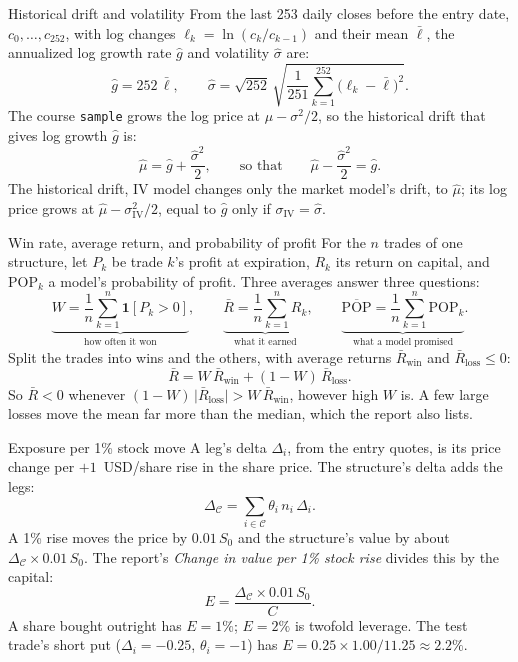\documentclass[aspectratio=169,11pt]{beamer}
\newcommand{\one}{\mathbf{1}}
\newcommand{\POP}{\mathrm{POP}}
\newcommand{\IV}{\sigma_{\mathrm{IV}}}
\begin{document}
\begin{frame}{Historical drift and volatility}\label{fr:hist}
From the last 253 daily closes before the entry date, $c_0,\ldots,c_{252}$, with
log changes $\ell_k=\ln(c_k/c_{k-1})$ and their mean $\bar\ell$, the annualized
log growth rate $\hat g$ and volatility $\hat\sigma$ are:
\[
 \hat g=252\,\bar\ell,\qquad
 \hat\sigma=\sqrt{252}\,\sqrt{\frac{1}{251}\sum_{k=1}^{252}\bigl(\ell_k-\bar\ell\bigr)^2}.
\]
The course \texttt{sample} grows the log price at $\mu-\sigma^2/2$, so the
historical drift that gives log growth $\hat g$ is:
\[
 \hat\mu=\hat g+\frac{\hat\sigma^2}{2},
 \qquad\text{so that}\qquad
 \hat\mu-\frac{\hat\sigma^2}{2}=\hat g.
\]
The historical drift, IV model changes only the market model's drift, to
$\hat\mu$; its log price grows at $\hat\mu-\IV^2/2$, equal to $\hat g$ only if
$\IV=\hat\sigma$.
\end{frame}

\begin{frame}{Win rate, average return, and probability of profit}
For the $n$ trades of one structure, let $P_k$ be trade $k$'s profit at
expiration, $R_k$ its return on capital, and $\POP_k$ a model's probability of
profit. Three averages answer three questions:
\[
 \underbrace{W=\frac1n\sum_{k=1}^{n}\one[P_k>0]}_{\text{how often it won}},\qquad
 \underbrace{\bar R=\frac1n\sum_{k=1}^{n}R_k}_{\text{what it earned}},\qquad
 \underbrace{\overline{\POP}=\frac1n\sum_{k=1}^{n}\POP_k}_{\text{what a model promised}}.
\]
Split the trades into wins and the others, with average returns
$\bar R_{\text{win}}$ and $\bar R_{\text{loss}}\leq0$:
\[
 \bar R=W\,\bar R_{\text{win}}+(1-W)\,\bar R_{\text{loss}}.
\]
So $\bar R<0$ whenever $(1-W)\,\lvert\bar R_{\text{loss}}\rvert>W\,\bar R_{\text{win}}$,
however high $W$ is. A few large losses move the mean far more than the
median, which the report also lists.
\end{frame}

\begin{frame}{Exposure per 1\% stock move}
\setlength{\abovedisplayskip}{4pt}\setlength{\belowdisplayskip}{4pt}%
A leg's delta $\Delta_i$, from the entry quotes, is its price change per
$+1$~USD/share rise in the share price. The structure's delta adds the legs:
\[
 \Delta_{\mathcal{C}}=\sum_{i\in\mathcal{C}}\theta_i\,n_i\,\Delta_i .
\]
A 1\% rise moves the price by $0.01\,S_0$ and the structure's value by about
$\Delta_{\mathcal{C}}\times0.01\,S_0$. The report's \emph{Change in value per 1\%
stock rise} divides this by the capital:
\[
 E=\frac{\Delta_{\mathcal{C}}\times0.01\,S_0}{C}.
\]
A share bought outright has $E=1\%$; $E=2\%$ is twofold leverage. The test trade's short put ($\Delta_i=-0.25$,
$\theta_i=-1$) has $E=0.25\times1.00/11.25\approx2.2\%$.
\end{frame}
\end{document}
